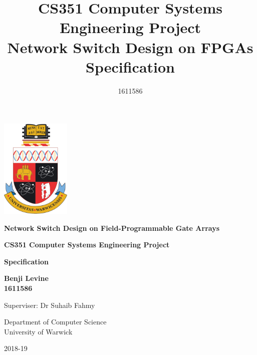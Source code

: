\begin{titlepage}
   \begin{center}
       \vspace*{1.5cm}

      \includegraphics[width=0.25\textwidth]{warwick_logo_old.png}

      \vspace{1.5cm}
      \textbf{\Large{Network Switch Design on Field-Programmable Gate Arrays}}

      \vspace{1.5cm}
      \textbf{\large{CS351 Computer Systems Engineering Project}} \\
      \vspace{0.5cm}


      \textbf{\large{Specification}}

      \vspace{4cm}

      \textbf{Benji Levine} \\
      \vspace{0.1cm}
      \textbf{1611586}

      \vspace{4cm}

      Superviser: Dr Suhaib Fahmy

      \vspace{0.8cm}

      Department of Computer Science\\
      University of Warwick

      \vspace{0.7cm}

      2018-19

   \end{center}
\end{titlepage}


\title{CS351 Computer Systems Engineering Project \\ \vspace{0.5cm} Network Switch Design on FPGAs \\ \vspace{0.3cm} \Large{Specification}}
\author{1611586}
